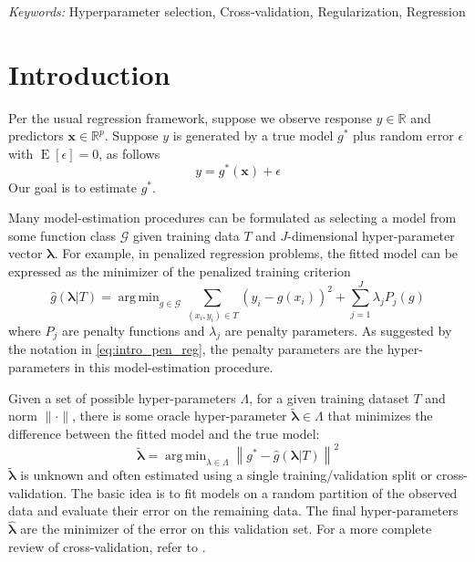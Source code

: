 \documentclass[12pt]{article}
\DeclareMathOperator*{\argmin}{arg\,min}
\begin{document}
\noindent%
{\it Keywords:}  Hyperparameter selection, Cross-validation, Regularization, Regression
\vfill

\newpage
{}
\section{Introduction}

Per the usual regression framework, suppose we observe response $y \in \mathbb{R}$ and predictors $\boldsymbol {x} \in \mathbb{R}^p$. Suppose $y$ is generated by a true model $g^*$ plus random error $\epsilon$ with $\operatorname{E}\left[\epsilon\right] = 0$, as follows
\begin{equation}
\label{true_model}
y = g^*(\boldsymbol x) + \epsilon
\end{equation}
Our goal is to estimate $g^*$.

Many model-estimation procedures can be formulated as selecting a model from some function class $\mathcal{G}$ given training data $T$ and $J$-dimensional hyper-parameter vector $\boldsymbol{\lambda}$. For example, in penalized regression problems, the fitted model can be expressed as the minimizer of the penalized training criterion
\begin{equation}
\label{eq:intro_pen_reg}
\hat{g}(\boldsymbol \lambda | T) = \argmin_{g\in \mathcal{G}} \sum_{(x_i, y_i) \in T} \left (y_i -  g(x_i) \right )^2 + \sum_{j=1}^J \lambda_j P_j(g)
\end{equation}
where $P_j$ are penalty functions and $\lambda_j$ are penalty parameters. As suggested by the notation in \eqref{eq:intro_pen_reg}, the penalty parameters are the hyper-parameters in this model-estimation procedure.

Given a set of possible hyper-parameters $\Lambda$, for a given training dataset $T$ and norm $\|\cdot\|$, there is some oracle hyper-parameter $\tilde{\boldsymbol{\lambda}} \in \Lambda$ that minimizes the difference between the fitted model and the true model:
\[
\tilde{\boldsymbol{\lambda}} = \argmin_{\lambda \in \Lambda} \left\|g^{*} - \hat{g}\left(\boldsymbol{\lambda|}T\right)\right\|^2
\]
$\tilde{\boldsymbol{\lambda}}$ is unknown and often estimated using a single training/validation split or cross-validation. The basic idea is to fit models on a random partition of the observed data and evaluate their error on the remaining data. The final hyper-parameters $\hat{\boldsymbol{\lambda}}$ are the minimizer of the error on this validation set. For a more complete review of cross-validation, refer to \citet{arlot2010survey}.
\end{document}
